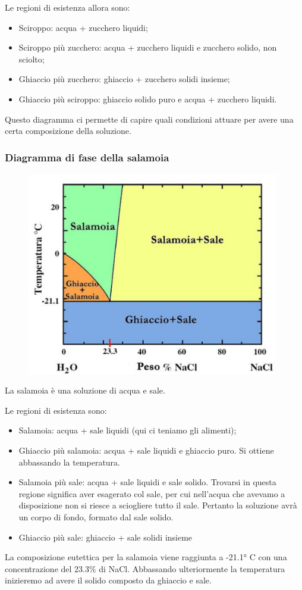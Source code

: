 Le regioni di esistenza allora sono:

\begin{itemize}
    \item Sciroppo: acqua + zucchero liquidi;
    \item Sciroppo più zucchero: acqua + zucchero liquidi e zucchero solido, non sciolto;
    \item Ghiaccio più zucchero: ghiaccio + zucchero solidi insieme;
    \item Ghiaccio più sciroppo: ghiaccio solido puro e acqua + zucchero liquidi.
\end{itemize}

Questo diagramma ci permette di capire quali condizioni attuare per avere una certa composizione della soluzione.
\subsubsection{Diagramma di fase della salamoia}

\begin{figure}[htp]
    \centering
    \includegraphics[width=11cm]{immagini/diagramma_di_stato_salamoia.png}
\end{figure}

La salamoia è una soluzione di acqua e sale.

Le regioni di esistenza sono:

\begin{itemize}
    \item Salamoia: acqua + sale liquidi (qui ci teniamo gli alimenti);
    \item Ghiaccio più salamoia: acqua + sale liquidi e ghiaccio puro. Si ottiene abbassando la temperatura.
    \item Salamoia più sale: acqua + sale liquidi e sale solido. Trovarsi in questa regione significa aver esagerato col sale, per cui nell'acqua che avevamo a disposizione non si riesce a sciogliere tutto il sale. Pertanto la soluzione avrà un corpo di fondo, formato dal sale solido.
    \item Ghiaccio più sale: ghiaccio + sale solidi insieme
\end{itemize}

La composizione eutettica per la salamoia viene raggiunta a -21.1° C con una concentrazione del 23.3\% di NaCl. Abbassando ulteriormente la temperatura inizieremo ad avere il solido composto da ghiaccio e sale.
